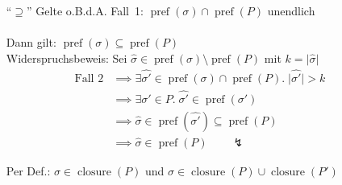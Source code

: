\documentclass{beamer}
\DeclareMathOperator{\pref}{pref}
\DeclareMathOperator{\closure}{closure}
\begin{document}
\begin{frame}
    \begin{Beweis}
        \begin{itemize}
            \item[``$\supseteq$'']
                Gelte o.B.d.A. Fall~1: $\pref(\sigma) \cap \pref(P)$ unendlich\\~\\

                Dann gilt: $\pref(\sigma) \subseteq \pref(P)$ \\
                Widerspruchsbeweis: Sei $\widehat{\sigma} \in \pref(\sigma) \setminus \pref(P)$ mit $k= \big|\widehat{\sigma}\big|$
                \begin{align*}\text{Fall~2}
                    &\implies \exists \widehat{\sigma'} \in \pref(\sigma) \cap \pref(P). \; \big|\widehat{\sigma'}\big| > k \\
                    &\implies \exists \sigma' \in P.\; \widehat{\sigma'} \in \pref(\sigma') \\
                    &\implies \widehat{\sigma} \in \pref(\widehat{\sigma'}) \subseteq \pref(P) \\
                    &\implies \widehat{\sigma} \in \pref(P) \qquad \lightning
                \end{align*}

                Per Def.: $\sigma \in \closure(P)$ und
                    $\sigma \in \closure(P) \cup \closure(P')$
        \end{itemize}
    \end{Beweis}
\end{frame}
\end{document}
